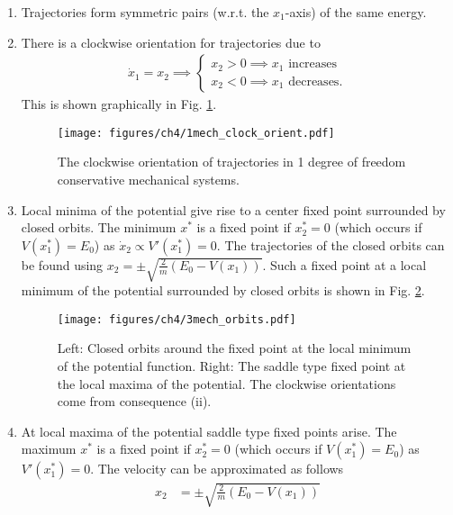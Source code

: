 \begin{enumerate}
	\item Trajectories form symmetric pairs (w.r.t. the $x_1$-axis) of the same energy.
	\item There is a clockwise orientation for trajectories due to 
		\begin{align}
			\dot{x}_1 = x_2 \implies
			\begin{cases}
				x_2>0 \implies x_1  \textrm{ increases} \\
				x_2 <0 \implies x_1  \textrm{ decreases} .
			\end{cases}
		\end{align}
		This is shown graphically in Fig. \ref{fig:mech_clock_orient}.
		\begin{figure}[h!]
			\centering
			\texttt{[image: figures/ch4/1mech\_clock\_orient.pdf]}
			\caption{The clockwise orientation of trajectories in 1 degree of freedom conservative mechanical systems.}
			\label{fig:mech_clock_orient}
		\end{figure}
	\item Local minima of the potential give rise to a center fixed point surrounded by closed orbits. The minimum $x^{*} $ is a fixed point if $x^{*}_2 = 0$ (which occurs if $V(x^*_1) = E_0$) as $\dot{x}_2 \propto V'(x^{*}_1) = 0 $. The trajectories of the closed orbits can be found using $x_2 = \pm \sqrt{\frac{2}{m}(E_0 - V(x_1))}$. Such a fixed point at a local minimum of the potential surrounded by closed orbits is shown in Fig. \ref{fig:mech_loc_extrem}.
\begin{figure}[h!]
	\centering
	\texttt{[image: figures/ch4/3mech\_orbits.pdf]}
	\caption{Left: Closed orbits around the fixed point at the local minimum of the potential function. Right: The saddle type fixed point at the local maxima of the potential. The clockwise orientations come from consequence (ii).}
	\label{fig:mech_loc_extrem}
\end{figure}
\item At local maxima of the potential saddle type fixed points arise. The maximum $x^{*}$ is a fixed point if $x^{*}_2=0 $ (which occurs if $V(x^*_1)=E_0$) as $V'(x^{*}_1)=0$. The velocity can be approximated as follows
	\begin{subequations}
	 \begin{align}
		 x_2 &= \pm \sqrt{\frac{2}{m}(E_0 -V(x_1))} \\

\end{align}
\end{subequations}
\end{enumerate}
